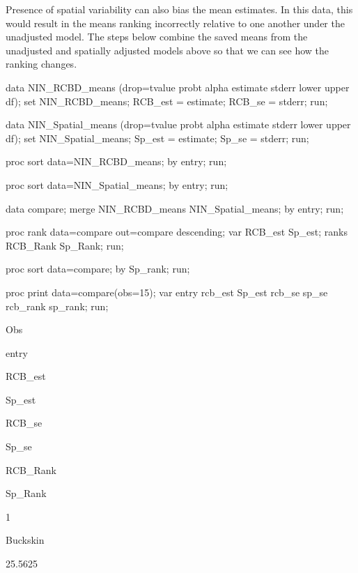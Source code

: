 \documentclass[
]{book}
\newenvironment{Shaded}{\begin{snugshade}}{\end{snugshade}}
\newcommand{\NormalTok}[1]{#1}
\begin{document}
Presence of spatial variability can also bias the mean estimates. In this data, this would result in the means ranking incorrectly relative to one another under the unadjusted model. The steps below combine the saved means from the unadjusted and spatially adjusted models above so that we can see how the ranking changes.

\begin{Shaded}
\begin{Highlighting}[]

\NormalTok{data NIN\_RCBD\_means (drop=tvalue probt alpha estimate stderr lower upper df);}
\NormalTok{    set NIN\_RCBD\_means;}
\NormalTok{    RCB\_est = estimate;}
\NormalTok{    RCB\_se = stderr;}
\NormalTok{run;}

\NormalTok{data NIN\_Spatial\_means (drop=tvalue probt alpha estimate stderr lower upper df);}
\NormalTok{    set NIN\_Spatial\_means;}
\NormalTok{    Sp\_est = estimate;}
\NormalTok{    Sp\_se = stderr;}
\NormalTok{run;}

\NormalTok{proc sort data=NIN\_RCBD\_means;}
\NormalTok{    by entry;}
\NormalTok{run;}

\NormalTok{proc sort data=NIN\_Spatial\_means;}
\NormalTok{    by entry;}
\NormalTok{run;}

\NormalTok{data compare;}
\NormalTok{    merge NIN\_RCBD\_means NIN\_Spatial\_means;}
\NormalTok{    by entry;}
\NormalTok{run;}

\NormalTok{proc rank data=compare out=compare descending;}
\NormalTok{    var RCB\_est Sp\_est;}
\NormalTok{    ranks RCB\_Rank Sp\_Rank;}
\NormalTok{run;}

\NormalTok{proc sort data=compare;}
\NormalTok{    by  Sp\_rank;}
\NormalTok{run;}

\NormalTok{proc print data=compare(obs=15);}
\NormalTok{    var entry rcb\_est Sp\_est rcb\_se sp\_se rcb\_rank sp\_rank;}
\NormalTok{run;}
\end{Highlighting}
\end{Shaded}

Obs

entry

RCB\_est

Sp\_est

RCB\_se

Sp\_se

RCB\_Rank

Sp\_Rank

1

Buckskin

25.5625
\end{document}
